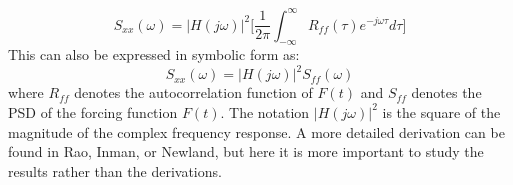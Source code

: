 \documentclass[12pt,letter]{article}
\begin{document}






\begin{equation}
S_{xx}(\omega) =  |H(j\omega)|^2\Bigg[\frac{1}{2 \pi } \int_{-\infty}^{\infty} R_{ff}(\tau) e^{-j \omega \tau}d  \tau  \Bigg] 
\end{equation}
This can also be expressed in symbolic form as:
\begin{equation}
S_{xx}(\omega) =  |H(j\omega)|^2 S_{ff}(\omega)
\end{equation}
where $R_{ff}$ denotes the autocorrelation function of $F(t)$ and $S_{ff}$ denotes the PSD of the forcing function $F(t)$. The notation $|H(j\omega)|^2$ is the square of the magnitude of the complex frequency response. A more detailed derivation can be found in Rao\protect\footnotemark[1], Inman\protect\footnotemark[2], or Newland\protect\footnotemark[3], but here it is more important to study the results rather than the derivations.

\end{document}

